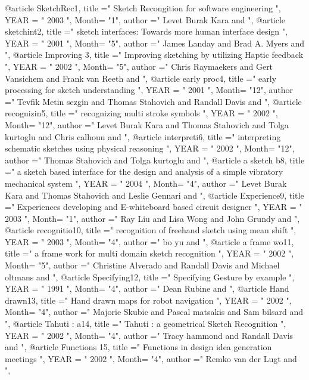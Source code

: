 @article{ SketchRec1, 
  title ="  Sketch Recongition for software engineering  ", 
 YEAR = " 2003  ",
Month= "1",
 author =" Levet Burak  Kara   and  ",
}
@article{ sketchint2, 
  title ="  sketch interfaces: Towards more human interface design  ", 
 YEAR = " 2001  ",
Month= "5",
 author =" James Landay   and  Brad A. Myers   and  ",
}
@article{ Improving 3, 
  title ="  Improving sketching by utilizing Haptic feedback  ", 
 YEAR = " 2002  ",
Month= "5",
 author =" Chris Raymaekers   and  Gert Vansichem   and  Frank van Reeth   and  ",
}
@article{ early proc4, 
  title ="  early processing for sketch understanding  ", 
 YEAR = " 2001  ",
Month= "12",
 author =" Tevfik Metin sezgin   and  Thomas Stahovich   and  Randall Davis   and  ",
}
@article{ recognizin5, 
  title ="  recognizing multi stroke symbols  ", 
 YEAR = " 2002  ",
Month= "12",
 author =" Levet Burak  Kara   and  Thomas Stahovich   and  Tolga kurtoglu    and  Chris calhoun   and  ",
}
@article{ interpreti6, 
  title ="  interpreting schematic sketches using physical reasoning  ", 
 YEAR = " 2002  ",
Month= "12",
 author =" Thomas Stahovich   and  Tolga kurtoglu    and  ",
}
@article{ a sketch b8, 
  title ="  a sketch based interface for the design and analysis of a simple vibratory mechanical system  ", 
 YEAR = " 2004  ",
Month= "4",
 author =" Levet Burak  Kara   and  Thomas Stahovich   and  Leslie Gennari   and  ",
}
@article{ Experience9, 
  title ="  Experiences developing and E-whiteboard based circuit designer  ", 
 YEAR = " 2003  ",
Month= "1",
 author =" Ray Liu   and  Lisa  Wong    and  John Grundy   and  ",
}
@article{ recognitio10, 
  title ="  recognition of freehand sketch using mean shift  ", 
 YEAR = " 2003  ",
Month= "4",
 author =" bo yu   and  ",
}
@article{ a frame wo11, 
  title ="  a frame work for multi domain sketch recognition  ", 
 YEAR = " 2002  ",
Month= "5",
 author =" Christine Alverado   and  Randall Davis   and  Michael oltmans   and  ",
}
@article{ Specifying12, 
  title ="  Specifying Gesture by example  ", 
 YEAR = " 1991  ",
Month= "4",
 author =" Dean Rubine    and  ",
}
@article{ Hand drawn13, 
  title ="  Hand drawn  maps for robot navigation  ", 
 YEAR = " 2002  ",
Month= "4",
 author =" Majorie Skubic    and   Pascal matsakis   and  Sam bilsard   and  ",
}
@article{ Tahuti : a14, 
  title ="  Tahuti : a geometrical Sketch Recognition  ", 
 YEAR = " 2002  ",
Month= "4",
 author =" Tracy hammond   and  Randall Davis   and  ",
}
@article{ Functions 15, 
  title ="  Functions in design idea generation meetings  ", 
 YEAR = " 2002  ",
Month= "4",
 author =" Remko van der Lugt   and  ",
}
